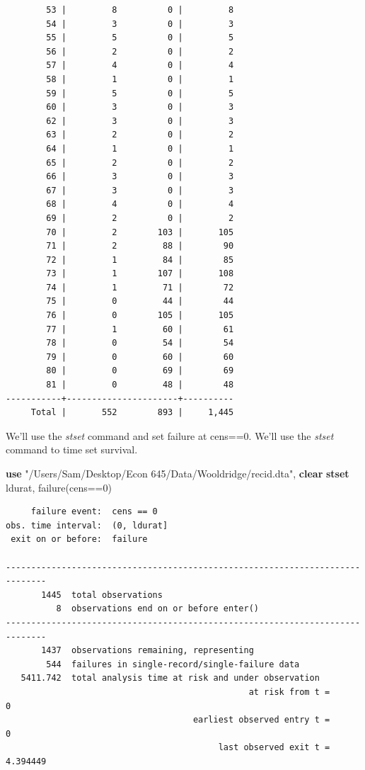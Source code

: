 \documentclass[
]{book}
\newenvironment{Shaded}{\begin{snugshade}}{\end{snugshade}}
\newcommand{\KeywordTok}[1]{\textcolor[rgb]{0.13,0.29,0.53}{\textbf{#1}}}
\newcommand{\NormalTok}[1]{#1}
\newcommand{\StringTok}[1]{\textcolor[rgb]{0.31,0.60,0.02}{#1}}
\begin{document}
\begin{verbatim}
        53 |         8          0 |         8 
        54 |         3          0 |         3 
        55 |         5          0 |         5 
        56 |         2          0 |         2 
        57 |         4          0 |         4 
        58 |         1          0 |         1 
        59 |         5          0 |         5 
        60 |         3          0 |         3 
        62 |         3          0 |         3 
        63 |         2          0 |         2 
        64 |         1          0 |         1 
        65 |         2          0 |         2 
        66 |         3          0 |         3 
        67 |         3          0 |         3 
        68 |         4          0 |         4 
        69 |         2          0 |         2 
        70 |         2        103 |       105 
        71 |         2         88 |        90 
        72 |         1         84 |        85 
        73 |         1        107 |       108 
        74 |         1         71 |        72 
        75 |         0         44 |        44 
        76 |         0        105 |       105 
        77 |         1         60 |        61 
        78 |         0         54 |        54 
        79 |         0         60 |        60 
        80 |         0         69 |        69 
        81 |         0         48 |        48 
-----------+----------------------+----------
     Total |       552        893 |     1,445 
\end{verbatim}

We'll use the \emph{stset} command and set failure at cens==0. We'll use the \emph{stset} command to time set survival.

\begin{Shaded}
\begin{Highlighting}[]
\KeywordTok{use} \StringTok{"/Users/Sam/Desktop/Econ 645/Data/Wooldridge/recid.dta"}\NormalTok{, }\KeywordTok{clear}
\KeywordTok{stset}\NormalTok{ ldurat, failure(cens==0)}
\end{Highlighting}
\end{Shaded}

\begin{verbatim}
     failure event:  cens == 0
obs. time interval:  (0, ldurat]
 exit on or before:  failure

------------------------------------------------------------------------------
       1445  total observations
          8  observations end on or before enter()
------------------------------------------------------------------------------
       1437  observations remaining, representing
        544  failures in single-record/single-failure data
   5411.742  total analysis time at risk and under observation
                                                at risk from t =         0
                                     earliest observed entry t =         0
                                          last observed exit t =  4.394449
\end{verbatim}
\end{document}
